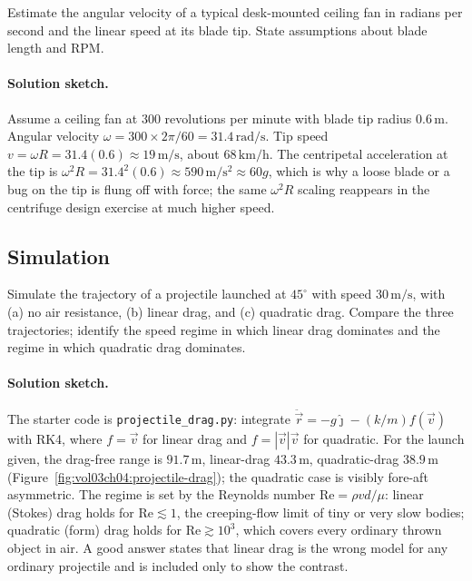 \begin{exercise}
Estimate the angular velocity of a typical desk-mounted ceiling fan
in radians per second and the linear speed at its blade tip. State
assumptions about blade length and RPM.
\paragraph{Solution sketch.} Assume a ceiling fan at $300$ revolutions
per minute with blade tip radius $0.6\,\si{\meter}$. Angular velocity
$\omega=300\times 2\pi/60=31.4\,\si{\radian\per\second}$. Tip speed
$v=\omega R=31.4(0.6)\approx 19\,\si{\meter\per\second}$, about
$68\,\si{\kilo\meter\per\hour}$. The centripetal acceleration at the
tip is $\omega^{2}R=31.4^{2}(0.6)\approx 590\,\si{\meter\per\second
\squared}\approx 60g$, which is why a loose blade or a bug on the tip
is flung off with force; the same $\omega^{2}R$ scaling reappears in
the centrifuge design exercise at much higher speed.
\end{exercise}

\subsection*{Simulation}

\begin{exercise}
Simulate the trajectory of a projectile launched at $45^{\circ}$ with
speed $30\,\si{\meter\per\second}$, with (a) no air resistance, (b)
linear drag, and (c) quadratic drag. Compare the three trajectories;
identify the speed regime in which linear drag dominates and the
regime in which quadratic drag dominates.
\paragraph{Solution sketch.} The starter code is
\texttt{projectile\_drag.py}: integrate $\ddot{\vec{r}}=-g\hat{\jmath}
-(k/m)f(\vec{v})$ with RK4, where $f=\vec{v}$ for linear drag and
$f=|\vec{v}|\vec{v}$ for quadratic. For the launch given, the
drag-free range is $91.7\,\si{\meter}$, linear-drag $43.3\,\si{
\meter}$, quadratic-drag $38.9\,\si{\meter}$
(Figure~\ref{fig:vol03ch04:projectile-drag}); the quadratic case is
visibly fore-aft asymmetric. The regime is set by the Reynolds number
$\mathrm{Re}=\rho v d/\mu$: linear (Stokes) drag holds for
$\mathrm{Re}\lesssim 1$, the creeping-flow limit of tiny or very slow
bodies; quadratic (form) drag holds for $\mathrm{Re}\gtrsim 10^{3}$,
which covers every ordinary thrown object in air. A good answer
states that linear drag is the wrong model for any ordinary
projectile and is included only to show the contrast.
\end{exercise}

